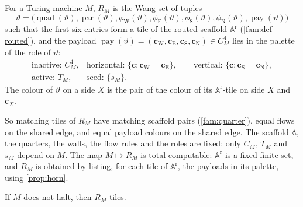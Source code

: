 \begin{definition}\label{def:family}
For a Turing machine $M$, $R_M$ is the Wang set of tuples
\[
\vartheta=\bigl(\operatorname{quad}(\vartheta),\operatorname{par}(\vartheta),\phi_{\mathrm W}(\vartheta),\phi_{\mathrm E}(\vartheta),\phi_{\mathrm S}(\vartheta),\phi_{\mathrm N}(\vartheta),\operatorname{pay}(\vartheta)\bigr)
\]
such that the first six entries form a tile of the routed scaffold $\mathbb A^{\mathrm r}$ (\cref{fam:def-routed}), and the payload $\operatorname{pay}(\vartheta)=(\mathbf c_{\mathrm W},\mathbf c_{\mathrm E},\mathbf c_{\mathrm S},\mathbf c_{\mathrm N})\in C_M^4$ lies in the palette of the role of $\vartheta$:
\[
\begin{array}{ll}
\text{inactive: } C_M^4, & \text{horizontal: } \{\mathbf c:\mathbf c_{\mathrm W}=\mathbf c_{\mathrm E}\},\qquad \text{vertical: } \{\mathbf c:\mathbf c_{\mathrm S}=\mathbf c_{\mathrm N}\},\\
\text{active: } T_M, & \text{seed: } \{s_M\}.
\end{array}
\]
The colour of $\vartheta$ on a side $X$ is the pair of the colour of its $\mathbb A^{\mathrm r}$-tile on side $X$ and $\mathbf c_X$.
\end{definition}

So matching tiles of $R_M$ have matching scaffold pairs (\cref{fam:quarter}), equal flows on the shared edge, and equal payload colours on the shared edge. The scaffold $\mathbb A$, the quarters, the walls, the flow rules and the roles are fixed; only $C_M$, $T_M$ and $s_M$ depend on $M$. The map $M\mapsto R_M$ is total computable: $\mathbb A^{\mathrm r}$ is a fixed finite set, and $R_M$ is obtained by listing, for each tile of $\mathbb A^{\mathrm r}$, the payloads in its palette, using \cref{prop:horn}.

\begin{proposition}\label{prop:tiles}
If $M$ does not halt, then $R_M$ tiles.
\end{proposition}

